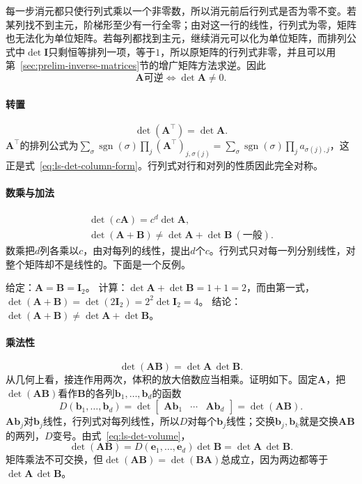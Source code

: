 每一步消元都只使行列式乘以一个非零数，所以消元前后行列式是否为零不变。若某列找不到主元，阶梯形至少有一行全零；由对这一行的线性，行列式为零，矩阵也无法化为单位矩阵。若每列都找到主元，继续消元可以化为单位矩阵，而排列公式中$\det\bm I$只剩恒等排列一项，等于$1$，所以原矩阵的行列式非零，并且可以用第~\ref{sec:prelim-inverse-matrices}节的增广矩阵方法求逆。因此
\[
 \bm A\text{可逆}\iff\det\bm A\neq0.
\]

\paragraph{转置}
\[
 \det(\bm A^\top)=\det\bm A.
\]
$\bm A^\top$的排列公式为$\sum_\sigma\operatorname{sgn}(\sigma)\prod_j(\bm A^\top)_{j,\sigma(j)}=\sum_\sigma\operatorname{sgn}(\sigma)\prod_ja_{\sigma(j),j}$，这正是式~\eqref{eq:ls-det-column-form}。行列式对行和对列的性质因此完全对称。

\paragraph{数乘与加法}
\[
\begin{gathered}
\det(c\bm A)=c^d\det\bm A,\\
\det(\bm A+\bm B)\neq\det\bm A+\det\bm B\ (\text{一般}).
\end{gathered}
\]
数乘把$d$列各乘以$c$，由对每列的线性，提出$d$个$c$。行列式只对每一列分别线性，对整个矩阵却不是线性的。下面是一个反例。
\begin{example}[反例：行列式不保持加法]
\label{ex:ls-det-not-additive}
给定：$\bm A=\bm B=\bm I_2$。
计算：$\det\bm A+\det\bm B=1+1=2$，而由第一式，$\det(\bm A+\bm B)=\det(2\bm I_2)=2^2\det\bm I_2=4$。
结论：$\det(\bm A+\bm B)\neq\det\bm A+\det\bm B$。
\end{example}

\paragraph{乘法性}
\[
 \det(\bm A\bm B)=\det\bm A\,\det\bm B.
\]
从几何上看，接连作用两次，体积的放大倍数应当相乘。证明如下。固定$\bm A$，把$\det(\bm A\bm B)$看作$\bm B$的各列$\bm b_1,\ldots,\bm b_d$的函数
\[
 D(\bm b_1,\ldots,\bm b_d)=\det\begin{bmatrix}\bm A\bm b_1&\cdots&\bm A\bm b_d\end{bmatrix}=\det(\bm A\bm B).
\]
$\bm A\bm b_j$对$\bm b_j$线性，行列式对每列线性，所以$D$对每个$\bm b_j$线性；交换$\bm b_j,\bm b_k$就是交换$\bm A\bm B$的两列，$D$变号。由式~\eqref{eq:ls-det-volume}，
\[
 \det(\bm A\bm B)=D(\bm e_1,\ldots,\bm e_d)\det\bm B=\det\bm A\,\det\bm B.
\]
矩阵乘法不可交换，但$\det(\bm A\bm B)=\det(\bm B\bm A)$总成立，因为两边都等于$\det\bm A\,\det\bm B$。

